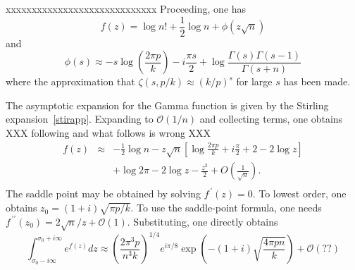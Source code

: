 \documentclass{amsart}
\begin{document}
xxxxxxxxxxxxxxxxxxxxxxxxxxxxx
Proceeding, one has \begin{equation}
f(z)=\log n!+\frac{1}{2}\log n+\phi\left(z\sqrt{n}\right)\label{eq:}\end{equation}
 and \begin{equation}
\phi(s)\approx-s\log\left(\frac{2\pi p}{k}\right)-i\frac{\pi s}{2}+\log\frac{\Gamma(s)\Gamma(s-1)}{\Gamma(s+n)}\label{eq:}\end{equation}
 where the approximation that $\zeta\left(s,p/k\right)\approx(k/p)^{s}$
for large $s$ has been made. 

The asymptotic expansion for the Gamma function is given by the Stirling
expansion~\eqref{stirapp}.
Expanding to $\mathcal{O}(1/n)$
and collecting terms, one obtains XXX following and what follows is
wrong XXX\begin{eqnarray}
f(z) & \approx & -\frac{1}{2}\log n-z\sqrt{n}\left[\log\frac{2\pi p}{k}+i\frac{\pi}{2}+2-2\log z\right]\nonumber \\
 &  & +\log2\pi-2\log z-\frac{z^{2}}{2}+O\left(\frac{1}{\sqrt{n}}\right).\label{eq:}\\
\end{eqnarray}
 The saddle point may be obtained  by solving $f^{\,\prime}(z)=0$.  To
 lowest order, one  obtains $z_{0}=(1+i)\sqrt{\pi  p/k}$. To  use  the
 saddle-point           formula,             one                 needs
 $f^{\,\prime\prime}(z_{0})=2\sqrt{n}/z+\mathcal{O}(1)$.
 Substituting, one directly obtains \begin{equation}
\int_{\sigma_{0}-i\infty}^{\sigma_{0}+i\infty}e^{f(z)}dz\approx\left(\frac{2\pi^{3}p}{n^{3}k}\right)^{1/4}e^{i\pi/8}\exp\left(-(1+i)\sqrt{\frac{4\pi pn}{k}}\right)+\mathcal{O}\left(??\right)\label{eq:}\end{equation}
\end{document}
